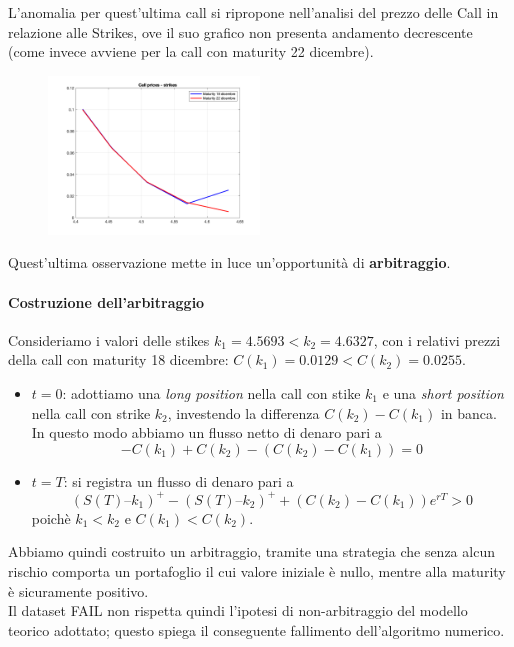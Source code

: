 \documentclass[11pt]{article}
\begin{document}
L’anomalia per quest’ultima call si ripropone nell’analisi del prezzo delle Call in relazione alle Strikes, ove il suo grafico non presenta andamento decrescente (come invece avviene per la call con maturity 22 dicembre). 


\begin{figure}[H]
\centering
\includegraphics[width=0.5\textwidth]{C_K}
\end{figure}

Quest’ultima osservazione mette in luce un’opportunità di \textbf{arbitraggio}.\\
\paragraph{Costruzione dell'arbitraggio} Consideriamo i valori delle stikes $k_1=4.5693 < k_2=4.6327$, con i relativi prezzi della call con maturity 18 dicembre: $C(k_1)=0.0129 < C(k_2)=0.0255$. \\
\begin{itemize}


\item \textbf{$t=0$}: adottiamo una \textit{long position}  nella call con stike $k_1$ e una \textit{short position} nella call con strike $k_2$, investendo la differenza $C(k_2)-C(k_1)$ in banca.\\ In questo modo abbiamo un flusso netto di denaro pari a $$-C(k_1)+C(k_2)-(C(k_2)-C(k_1))=0$$

\item \textbf{$t=T$}: si registra un flusso di denaro pari a $$(S(T) – k_1)^+ - (S(T) – k_2)^+ + (C(k_2)-C(k_1))e^{rT}> 0 $$ poichè $k_1<k_2$ e $C(k_1)<C(k_2)$. 
\end{itemize}

Abbiamo quindi costruito un arbitraggio, tramite una strategia che senza alcun rischio comporta un portafoglio il cui valore iniziale è nullo, mentre alla maturity è sicuramente positivo.\\
Il dataset FAIL non rispetta quindi l’ipotesi di non-arbitraggio del modello teorico adottato; questo spiega il conseguente fallimento dell’algoritmo numerico.
\end{document}
